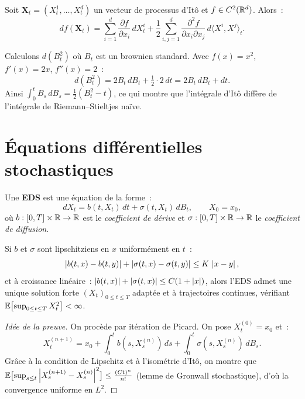 \begin{corollaire}
Soit $\mathbf{X}_t = (X_t^1, \ldots, X_t^d)$ un vecteur de processus
d'It\^o et $f \in C^2(\mathbb{R}^d)$. Alors~:
\[
  df(\mathbf{X}_t) = \sum_{i=1}^d \frac{\partial f}{\partial x_i}\,dX_t^i
    + \frac{1}{2}\sum_{i,j=1}^d \frac{\partial^2 f}{\partial x_i \partial x_j}
    \,d\langle X^i, X^j\rangle_t.
\]
\end{corollaire}

\begin{exemple}
Calculons $d(B_t^2)$ o\`u $B_t$ est un brownien standard.
Avec $f(x) = x^2$, $f'(x) = 2x$, $f''(x) = 2$~:
\[
  d(B_t^2) = 2B_t\,dB_t + \tfrac{1}{2}\cdot 2\,dt = 2B_t\,dB_t + dt.
\]
Ainsi $\int_0^t B_s\,dB_s = \frac{1}{2}(B_t^2 - t)$, ce qui montre que
l'int\'egrale d'It\^o diff\`ere de l'int\'egrale de Riemann--Stieltjes na\"ive.
\end{exemple}

\section{\'Equations diff\'erentielles stochastiques}
\label{sec:eds}

\begin{definition}
Une \textbf{EDS} est une \'equation de la forme~:
\[
  dX_t = b(t, X_t)\,dt + \sigma(t, X_t)\,dB_t, \qquad X_0 = x_0,
\]
o\`u $b : [0,T] \times \mathbb{R} \to \mathbb{R}$ est le \emph{coefficient de d\'erive}
et $\sigma : [0,T] \times \mathbb{R} \to \mathbb{R}$ le \emph{coefficient de diffusion}.
\end{definition}

\begin{theoreme}
\label{thm:existence_eds}
Si $b$ et $\sigma$ sont lipschitziens en $x$ uniform\'ement en $t$~:
\[
  \left| b(t,x) - b(t,y) \right| + \left| \sigma(t,x) - \sigma(t,y) \right| \leq K\,\left| x-y \right|,
\]
et \`a croissance lin\'eaire~:
$\left| b(t,x) \right| + \left| \sigma(t,x) \right| \leq C(1 + \left| x \right|)$,
alors l'EDS admet une unique solution forte $(X_t)_{0 \leq t \leq T}$
adapt\'ee et \`a trajectoires continues, v\'erifiant
$\mathbb{E}\bigl[\sup_{0 \leq t \leq T} X_t^2\bigr] < \infty$.
\end{theoreme}

\begin{proof}[Id\'ee de la preuve]
On proc\`ede par it\'eration de Picard. On pose $X_t^{(0)} = x_0$ et~:
\[
  X_t^{(n+1)} = x_0 + \int_0^t b(s, X_s^{(n)})\,ds
    + \int_0^t \sigma(s, X_s^{(n)})\,dB_s.
\]
Gr\^ace \`a la condition de Lipschitz et \`a l'isom\'etrie d'It\^o, on montre
que $\mathbb{E}\bigl[\sup_{s \leq t} \left| X_s^{(n+1)} - X_s^{(n)} \right|^2\bigr]
\leq \frac{(Ct)^n}{n!}$ (lemme de Gronwall stochastique), d'o\`u
la convergence uniforme en $L^2$.
\end{proof}

